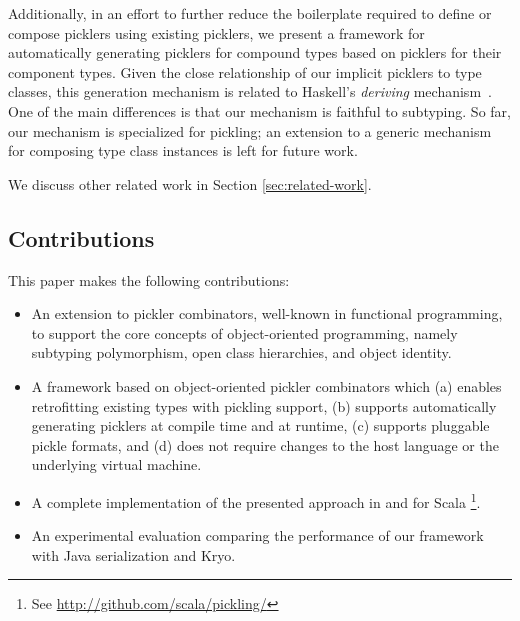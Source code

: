 \documentclass[preprint,10pt]{sigplanconf}
\theoremstyle{definition}
\theoremstyle{definition}
\begin{document}
Additionally, in an effort to further reduce the boilerplate required
to define or compose picklers using existing picklers, we present a
framework for automatically generating picklers for compound types
based on picklers for their component types. Given the close
relationship of our implicit picklers to type classes, this generation
mechanism is related to Haskell's {\em deriving}
mechanism~\cite{MagalhaesDJL10}. One of the main differences is that
our mechanism is faithful to subtyping. So far, our mechanism is
specialized for pickling; an extension to a generic mechanism for
composing type class instances is left for future work.

We discuss other related work in Section \ref{sec:related-work}.

\subsection{Contributions}

This paper makes the following contributions:

\begin{itemize}

\item An extension to pickler combinators, well-known in functional
programming, to support the core concepts of object-oriented programming,
namely subtyping polymorphism, open class hierarchies, and object identity.

\item A framework based on object-oriented pickler combinators which (a)
enables retrofitting existing types with pickling support, (b) supports
automatically generating picklers at compile time and at runtime, (c) supports
pluggable pickle formats, and (d) does not require changes to the host
language or the underlying virtual machine.

\item A complete implementation of the presented approach in and for Scala
\footnote{See \url{http://github.com/scala/pickling/}}.

\item An experimental evaluation comparing the performance of our framework
with Java serialization and Kryo.

\end{itemize}


\end{document}
